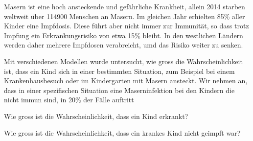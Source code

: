 Masern ist eine hoch ansteckende und gefährliche Krankheit,
allein 2014 starben weltweit über 114900 Menschen an Masern.
Im gleichen Jahr erhielten 85\% aller Kinder eine Impfdosis.
Diese führt aber nicht immer zur Immunität, so dass trotz Impfung
ein Erkrankungsrisiko von etwa 15\% bleibt.
In den westlichen Ländern werden daher mehrere Impfdosen verabreicht,
umd das Risiko weiter zu senken.

Mit verschiedenen Modellen wurde untersucht, wie gross die Wahrscheinlichkeit
ist, dass ein Kind sich in einer bestimmten Situation, zum Beispiel
bei einem Krankenhausbesuch oder im Kindergarten mit Masern ansteckt.
Wir nehmen an, dass in einer spezifischen Situation eine Maserninfektion
bei den Kindern die nicht immun sind, in 20\% der Fälle auftritt

\begin{teilaufgaben}
\item
Wie gross ist die Wahrscheinlichkeit, dass ein Kind erkrankt?
\item
Wie gross ist die Wahrscheinlichkeit, dass ein krankes Kind nicht
geimpft war?
\end{teilaufgaben}

